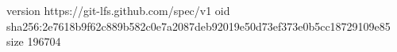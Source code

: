 version https://git-lfs.github.com/spec/v1
oid sha256:2e7618b9f62c889b582c0e7a2087deb92019e50d73ef373e0b5cc18729109e85
size 196704
